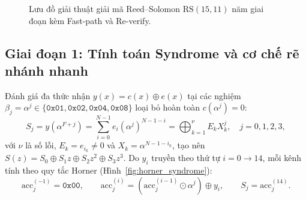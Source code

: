 \documentclass[11pt,a4paper]{report}
\begin{document}
\begin{figure}[!htb]
{%
}
\caption{Lưu đồ giải thuật giải mã Reed--Solomon $\text{RS}(15,11)$ năm giai đoạn kèm Fast-path và Re-verify.}
\label{fig:rs_decode_flow}
\end{figure}

\subsection{Giai đoạn 1: Tính toán Syndrome và cơ chế rẽ nhánh nhanh}

Đánh giá đa thức nhận $y(x) = c(x) \oplus e(x)$ tại các nghiệm $\beta_j = \alpha^j \in \{\texttt{0x01}, \texttt{0x02}, \texttt{0x04}, \texttt{0x08}\}$ loại bỏ hoàn toàn $c(\alpha^j) = 0$:
\begin{equation}
S_j = y(\alpha^{F+j}) = \sum_{i=0}^{N-1} e_i \left(\alpha^j\right)^{N-1-i} = \bigoplus_{k=1}^{\nu} E_k X_k^j, \quad j = 0, 1, 2, 3,
\label{eq:syndrome_def}
\end{equation}
với $\nu$ là số lỗi, $E_k = e_{i_k} \neq 0$ và $X_k = \alpha^{N-1-i_k}$, tạo nên $S(z) = S_0 \oplus S_1 z \oplus S_2 z^2 \oplus S_3 z^3$. Do $y_i$ truyền theo thứ tự $i = 0 \to 14$, mỗi kênh tính theo quy tắc Horner (Hình~\ref{fig:horner_syndrome}):
\begin{equation}
\text{acc}_j^{(-1)} = \texttt{0x00}, \qquad \text{acc}_j^{(i)} = \left(\text{acc}_j^{(i-1)} \odot \alpha^j\right) \oplus y_i, \qquad S_j = \text{acc}_j^{(14)}.
\label{eq:horner_step}
\end{equation}
\end{document}
